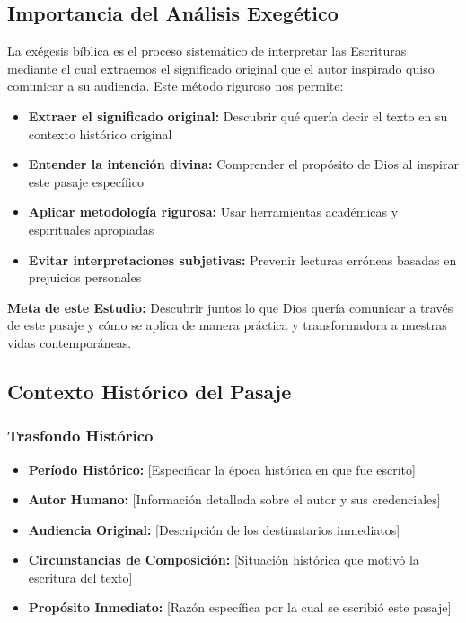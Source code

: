 \documentclass[12pt,a4paper]{article}
\begin{document}
\subsection{Importancia del Análisis Exegético}

La exégesis bíblica es el proceso sistemático de interpretar las Escrituras mediante el cual extraemos el significado original que el autor inspirado quiso comunicar a su audiencia. Este método riguroso nos permite:

\begin{itemize}[leftmargin=*]
    \item \textbf{Extraer el significado original:} Descubrir qué quería decir el texto en su contexto histórico original
    \item \textbf{Entender la intención divina:} Comprender el propósito de Dios al inspirar este pasaje específico
    \item \textbf{Aplicar metodología rigurosa:} Usar herramientas académicas y espirituales apropiadas
    \item \textbf{Evitar interpretaciones subjetivas:} Prevenir lecturas erróneas basadas en prejuicios personales
\end{itemize}

\begin{mdframed}[style=ImportantBox]
\textbf{Meta de este Estudio:} Descubrir juntos lo que Dios quería comunicar a través de este pasaje y cómo se aplica de manera práctica y transformadora a nuestras vidas contemporáneas.
\end{mdframed}

\subsection{Contexto Histórico del Pasaje}

\subsubsection{Trasfondo Histórico}

\begin{itemize}[leftmargin=*]
    \item \textbf{Período Histórico:} [Especificar la época histórica en que fue escrito]
    \item \textbf{Autor Humano:} [Información detallada sobre el autor y sus credenciales]
    \item \textbf{Audiencia Original:} [Descripción de los destinatarios inmediatos]
    \item \textbf{Circunstancias de Composición:} [Situación histórica que motivó la escritura del texto]
    \item \textbf{Propósito Inmediato:} [Razón específica por la cual se escribió este pasaje]
\end{itemize}
\end{document}
